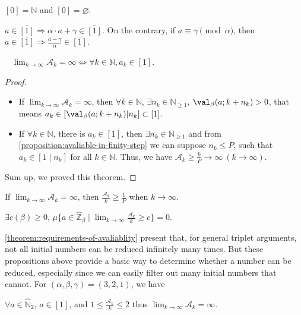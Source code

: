 \begin{proposition}
    $[0] = \mathbb{N}$ and $\bar{[0]} = \varnothing$.
\end{proposition}
\begin{proposition}
    $a \in \bar{[1]} \Longrightarrow \alpha \cdot a + \gamma \in \bar{[1]}$.
    On the contrary, if $a\equiv \gamma \pmod{\alpha}$, then $a \in \bar{[1]} \Longrightarrow \frac{a - \gamma}{\alpha} \in \bar{[1]}$.
\end{proposition}
\begin{theorem}~\label{theorem:requirements-of-avaliablity}
    $\lim_{k\to\infty} \mathcal{A}_k = \infty\Longleftrightarrow\forall k\in \mathbb{N}, a_k \in [1]$.
\end{theorem}
\begin{proof}
\begin{itemize}
    \item[$\Longrightarrow$)]
        If $\lim_{k\to\infty} \mathcal{A}_k = \infty$, then $\forall k \in \mathbb{N}$, $\exists n_{k} \in \mathbb{N}_{\ge1}$, $\val_{\beta}(a;k + n_{k}) > 0$,
        that means $a_{k} \in [\val_{\beta}(a;k + n_{k}) | n_{k}] \subset [1]$.
    \item[$\Longleftarrow$)] 
        If $\forall k \in \mathbb{N}$, there is $a_k \in [1]$, then $\exists n_{k} \in \mathbb{N}_{\ge1}$ and from \cref{proposition:avaliable-in-finity-step} we can suppose $n_k \le P$,
        such that $a_k \in [1 \mid n_{k}]$ for all $k \in \mathbb{N}$.
        Thus, we have $\mathcal{A}_k \ge \frac{k}{P} \to \infty\ (k \to \infty)$.
\end{itemize}
Sum up, we proved this theorem.
\end{proof}
\begin{corollary}
    If $\lim_{k\to\infty}\mathcal{A}_k = \infty$, then $\frac{\mathcal{A}_k}{k} \ge \frac{1}{P}$ when $k\to\infty$.
\end{corollary}
\begin{conjecture}
    $\exists c(\beta) \ge 0$, $\mu\{a \in\widehat{\mathbb{Z}}_{{\beta}} \mid \lim_{k\to\infty}\frac{\mathcal{A}_k}{k} \ge c \}  = 0$.
\end{conjecture}

\cref{theorem:requirements-of-avaliablity} present that, for general triplet arguments, not all initial numbers can be reduced infinitely many times.
But these propositions above provide a basic way to determine whether a number can be reduced, especially since we can easily filter out many initial numbers that cannot. For $(\alpha, \beta, \gamma) = (3, 2, 1)$, we have
\begin{corollary}
    $\forall a \in \widehat{\mathbb{N}}_{2}$, $a\in[1]$, and $1 \le \frac{\mathcal{A}_k}{k} \le 2$ thus $\lim_{k\to\infty}\mathcal{A}_k = \infty$.
\end{corollary}

